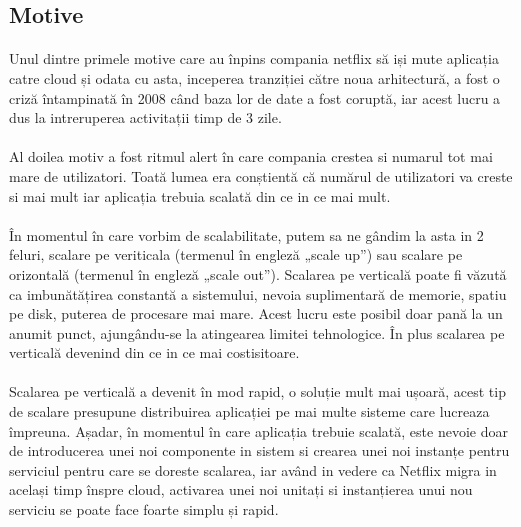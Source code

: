 \documentclass[12pt]{report}
\begin{document}
	\subsection{Motive}
	\paragraph{}Unul dintre primele motive care au înpins compania netflix să iși mute aplicația catre cloud și odata cu asta, inceperea tranziției către noua arhitectură, a fost o criză întampinată în 2008 când baza lor de date a fost coruptă, iar acest lucru a dus la intreruperea activitații timp de 3 zile. 
	\paragraph{}Al doilea motiv a fost ritmul alert în care compania crestea si numarul tot mai mare de utilizatori. Toată lumea era conștientă că numărul de utilizatori va creste si mai mult iar aplicația trebuia scalată din ce in ce mai mult.
	\paragraph{}În momentul în care vorbim de scalabilitate, putem sa ne gândim la asta in 2 feluri, scalare pe veriticala (termenul în engleză „scale up”) sau scalare pe orizontală (termenul în engleză „scale out”). Scalarea pe verticală poate fi văzută ca imbunătățirea constantă a sistemului, nevoia suplimentară de memorie, spatiu pe disk, puterea de procesare mai mare. Acest lucru este posibil doar pană la un anumit punct, ajungându-se la atingearea limitei tehnologice. În plus scalarea pe verticală devenind din ce in ce mai costisitoare.
	\paragraph{}Scalarea pe verticală a devenit în mod rapid, o soluție mult mai ușoară, acest tip de scalare presupune distribuirea aplicației pe mai multe sisteme care lucreaza împreuna. Așadar, în momentul în care aplicația trebuie scalată, este nevoie doar de introducerea unei noi componente in sistem si crearea unei noi instanțe pentru serviciul pentru care se doreste scalarea, iar având in vedere ca Netflix migra in același timp înspre cloud, activarea unei noi unitați si instanțierea unui nou serviciu se poate face foarte simplu și rapid.
\end{document}
